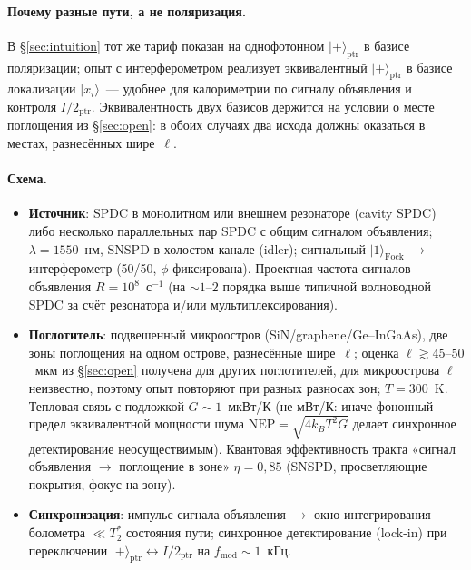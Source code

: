 \documentclass[11pt,a4paper]{article}
\newcommand{\Sref}[1]{\hyperref[#1]{\S\ref{#1}}}
\begin{document}
\paragraph{Почему разные пути, а не поляризация.}
В \Sref{sec:intuition} тот же тариф показан на однофотонном $|{+}\rangle_{\mathrm{ptr}}$ в базисе поляризации; опыт с интерферометром реализует эквивалентный $|{+}\rangle_{\mathrm{ptr}}$ в базисе локализации $|x_i\rangle$~--- удобнее для калориметрии по сигналу объявления и контроля $I/2_{\mathrm{ptr}}$. Эквивалентность двух базисов держится на условии о месте поглощения из \Sref{sec:open}: в обоих случаях два исхода должны оказаться в местах, разнесённых шире~$\ell$.

\paragraph{Схема.}
\begin{itemize}
\item \textbf{Источник}: SPDC в монолитном или внешнем резонаторе (cavity SPDC) либо несколько параллельных пар SPDC с общим сигналом объявления; $\lambda=1550$~нм, SNSPD в холостом канале (idler); сигнальный $|1\rangle_{\mathrm{Fock}}$ $\to$ интерферометр (50/50, $\phi$ фиксирована). Проектная частота сигналов объявления $R=10^{8}$~с$^{-1}$ (на $\sim 1$--$2$ порядка выше типичной волноводной SPDC за счёт резонатора и/или мультиплексирования).
\item \textbf{Поглотитель}: подвешенный микроостров (SiN/graphene/Ge--InGaAs), две зоны поглощения на одном острове, разнесённые шире~$\ell$; оценка $\ell\gtrsim 45$--$50$~мкм из \Sref{sec:open} получена для других поглотителей, для микроострова $\ell$ неизвестно, поэтому опыт повторяют при разных разносах зон; $T=300$~K. Тепловая связь с подложкой $G\sim 1$~мкВт/К (не мВт/К: иначе фононный предел эквивалентной мощности шума $\mathrm{NEP}=\sqrt{4k_BT^2G}$ делает синхронное детектирование неосуществимым). Квантовая эффективность тракта «сигнал объявления $\to$ поглощение в зоне» $\eta=0{,}85$ (SNSPD, просветляющие покрытия, фокус на зону).
\item \textbf{Синхронизация}: импульс сигнала объявления $\to$ окно интегрирования болометра $\ll T_2^*$ состояния пути; синхронное детектирование (lock-in) при переключении $|{+}\rangle_{\mathrm{ptr}}\leftrightarrow I/2_{\mathrm{ptr}}$ на $f_{\mathrm{mod}}\sim 1$~кГц.
\end{itemize}
\end{document}

